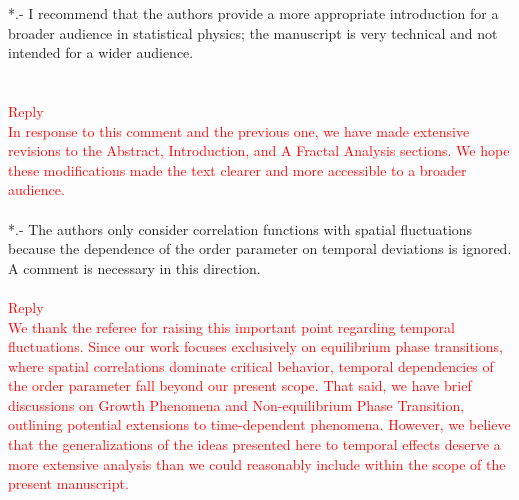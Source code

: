 \documentclass[prd,aps,nofootinbib]{revtex4}
\begin{document}
*.- I recommend that the authors provide a more appropriate
introduction for a broader audience in statistical physics; the
manuscript is very technical and not intended for a wider audience.\\
\\
\\
\textcolor{red}{Reply}\\
\textcolor{red}{In response to this comment and the previous one, we have made extensive revisions to the Abstract, Introduction, and A Fractal Analysis sections. We hope these modifications made the text clearer and more accessible to a broader audience.}\\
\\


*.- The authors only consider correlation functions with spatial fluctuations because the dependence of the order parameter on temporal deviations is ignored. A comment is necessary in this direction.\\
\\
\textcolor{red}{Reply}\\
\textcolor{red}{ We thank the referee for raising this important point regarding temporal fluctuations. Since our work focuses exclusively on equilibrium phase transitions, where spatial correlations dominate critical behavior, temporal dependencies of the order parameter fall beyond our present scope. That said, we have brief discussions on Growth Phenomena and Non-equilibrium Phase Transition, outlining potential extensions to time-dependent phenomena. However, we believe that the generalizations of the ideas presented here to temporal effects deserve a more extensive analysis than we could reasonably include within the scope of the present manuscript.%
}\\
\\
\end{document}
